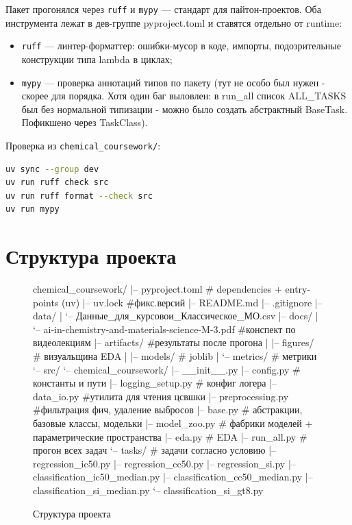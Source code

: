 \documentclass[12pt,a4paper]{report}
\begin{document}
Пакет прогонялся через \texttt{ruff} и \texttt{mypy} --- стандарт для пайтон-проектов.
Оба инструмента лежат в дев-группе pyproject.toml и ставятся отдельно от runtime:

\begin{itemize}
    \item \texttt{ruff} --- линтер-форматтер: ошибки-мусор в коде, импорты, подозрительные конструкции типа lambda в циклах;
    \item \texttt{mypy} --- проверка аннотаций типов по пакету (тут не особо был нужен - скорее для порядка. Хотя один баг выловлен: в run\_all список ALL\_TASKS был без нормальной типизации - можно было создать абстрактный BaseTask. Пофикшено через TaskClass).
\end{itemize}

Проверка из \texttt{chemical\_coursework/}:

\begin{lstlisting}[language=bash]
uv sync --group dev
uv run ruff check src
uv run ruff format --check src 
uv run mypy
\end{lstlisting}

\section{Структура проекта}

\begin{figure}[H]
\centering
\begin{treelisting}
chemical_coursework/              
|-- pyproject.toml                # dependencies + entry-points (uv)
|-- uv.lock                     #фикс.версий
|-- README.md
|-- .gitignore
|-- data/
|   `-- Данные_для_курсовои_Классическое_МО.csv
|-- docs/
|   `-- ai-in-chemistry-and-materials-science-M-3.pdf #конспект по видеолекциям
|-- artifacts/           #результаты после прогона 
|   |-- figures/        # визуальщина EDA
|   |-- models/        # joblib 
|   `-- metrics/             # метрики
`-- src/
    `-- chemical_coursework/    
        |-- __init__.py
        |-- config.py               # константы и пути
        |-- logging_setup.py      # конфиг логера
        |-- data_io.py               #утилита для чтения цсвшки
        |-- preprocessing.py     #фильтрация фич, удаление выбросов
        |-- base.py                  # абстракции, базовые классы, модельки                          
        |-- model_zoo.py        # фабрики моделей + параметрические пространства
        |-- eda.py          # EDA
        |-- run_all.py     # прогон всех задач
        `-- tasks/                    # задачи согласно условию
            |-- regression_ic50.py
            |-- regression_cc50.py
            |-- regression_si.py
            |-- classification_ic50_median.py
            |-- classification_cc50_median.py
            |-- classification_si_median.py
            `-- classification_si_gt8.py
\end{treelisting}
\caption{Структура проекта}
\label{lst:tree}
\end{figure}
\end{document}
